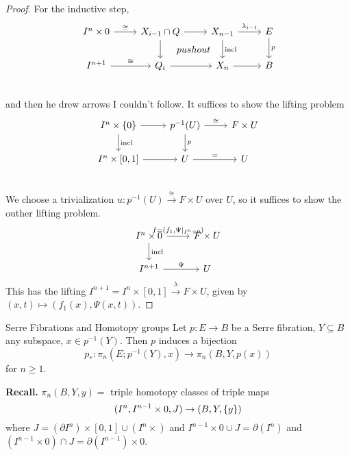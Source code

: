 \documentclass[language=english]{TemplateLecture}
\begin{document}
\begin{proof}
    For the inductive step,
    \[\begin{tikzcd}
        I^n \times 0 \ar[r, "\cong"] & X_{i-1} \cap Q \ar[r] \ar[d] \ar[dr, phantom, "pushout"] & X_{n-1} \ar[r, "\lambda_{i-1}"] \ar[d, "\incl"] & E \ar[d, "p"] \\
        I^{n+1} \ar[r, "\cong"] & Q_i \ar[r] & X_n \ar[r] & B \\
    \end{tikzcd}\]
    and then he drew arrows I couldn't follow. It suffices to show the lifting problem
    \[\begin{tikzcd}
        I^n \times \set 0 \ar[r] \ar[d, "\incl"] & p^{-1}(U) \ar[d, "p"] \ar[r, "\cong"] & F \times U \\
        I^n \times [0,1] \ar[r] & U \ar[r, "="] & U \\
    \end{tikzcd}\]
    We choose a trivialization \(u\colon p^{-1}(U) \xrightarrow{\cong} F \times U\) over \(U\), so it suffices to show the outher lifting problem.
    \[\begin{tikzcd}
        I^n \times 0 \ar[r, "{f = (f_1, \Psi\rvert_{I^n \times 0})}"] \ar[d, "\incl"] & F \times U \\
        I^{n+1} \ar[r, "\Psi"] & U
    \end{tikzcd}\]
    This has the lifting \(I^{n+1} = I^n \times [0,1] \xrightarrow{\lambda} F \times U\), given by \((x,t) \mapsto (f_1(x), \Psi(x,t))\).
\end{proof}

\begin{thm}{Serre Fibrations and Homotopy groups}{}
    Let \(p \colon E \to B\) be a Serre fibration, \(Y \subseteq B\) any subspace, \(x \in p^{-1}(Y)\). Then \(p\) induces a bijection
    \[p_*\colon \pi_n(E; p^{-1}(Y), x) \to \pi_n(B, Y, p(x))\]
    for \(n \geq 1\).
\end{thm}

\textbf{Recall.} \(\pi_n(B,Y,y) =\) triple homotopy classes of triple maps
\[(I^n, I^{n-1} \times 0, J) \to (B,Y, \{y\})\]
where \(J = (\partial I^n) \times[0,1] \cup (I^n \times )\) and \(I^{n-1} \times 0 \cup J = \partial(I^n)\) and \((I^{n-1} \times 0) \cap J = \partial(I^{n-1})\times 0\).
\end{document}
